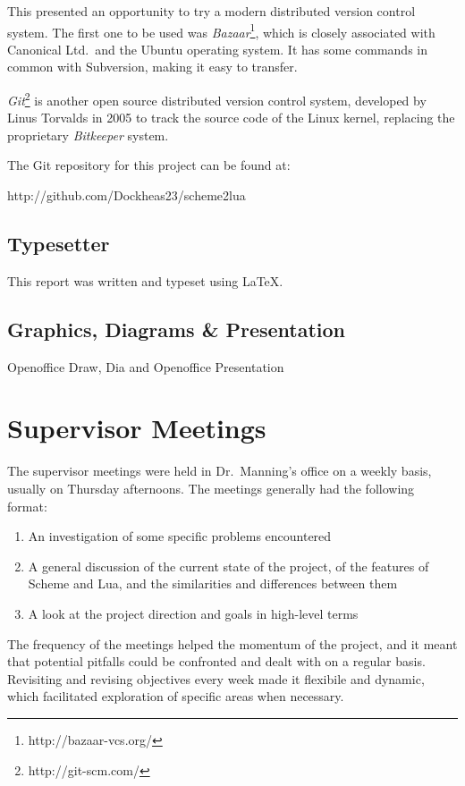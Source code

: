 This presented an opportunity to try a modern distributed version control
system. The first one to be used was
\emph{Bazaar}\footnote{http://bazaar-vcs.org/}, which is closely associated with
Canonical Ltd.\ and the Ubuntu operating system. It has some commands in common
with Subversion, making it easy to transfer.

\emph{Git}\footnote{http://git-scm.com/} is another open source distributed
version control system, developed by Linus Torvalds in 2005 to track the source
code of the Linux kernel, replacing the proprietary \emph{Bitkeeper} system.

The Git repository for this project can be found at:
\begin{center}http://github.com/Dockheas23/scheme2lua\end{center}

\subsection{Typesetter}

This report was written and typeset using \LaTeX.

\subsection{Graphics, Diagrams \& Presentation}

Openoffice Draw, Dia and Openoffice Presentation


\section{Supervisor Meetings}

The supervisor meetings were held in Dr.\ Manning's office on a weekly basis,
usually on Thursday afternoons. The meetings generally had the following format:

\begin{enumerate}
\item An investigation of some specific problems encountered
\item A general discussion of the current state of the project, of the
features of Scheme and Lua, and the similarities and differences between
them
\item A look at the project direction and goals in high-level terms
\end{enumerate}

The frequency of the meetings helped the momentum of the project, and it meant
that potential pitfalls could be confronted and dealt with on a regular basis.
Revisiting and revising objectives every week made it flexibile and dynamic,
which facilitated exploration of specific areas when necessary.

